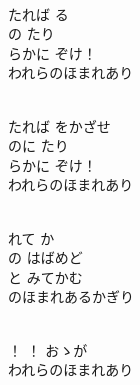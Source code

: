 \documentclass[10pt,b5j]{tarticle} %
\begin{document}
\vspace{1.5em} %
\newcommand{\linespace}{0.5em} %
\newcommand{\blocksize}{0.5\hsize} %
\newcommand{\itemmargin}{6em} %
\begin{enumerate} %
    \setlength{\itemindent}{\itemmargin} %
    \begin{minipage}[c]{\blocksize}
    
        \vspace{\linespace}
        \item~\\
        たれば る\\
        の たり\\
        らかに ぞけ！\\
        われらのほまれあり
        
        \vspace{\linespace}
        \item~\\
        たれば をかざせ\\
        のに たり\\
        らかに ぞけ！\\
        われらのほまれあり
        
        \vspace{\linespace}
        \item~\\
        れて か\\
        の はばめど\\
        と みてかむ\\
        のほまれあるかぎり
        
        \vspace{\linespace}
        \item~\\
        ！ ！ おゝが\\
        われらのほまれあり
    
    \end{minipage}
\end{enumerate} %
\end{document}
